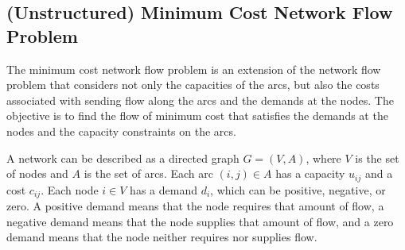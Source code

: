 \subsection{(Unstructured) Minimum Cost Network Flow Problem}
The minimum cost network flow problem is an extension of the network flow problem that considers not only the capacities of the arcs, but also the costs associated with sending flow along the arcs and the demands at the nodes. The objective is to find the flow of minimum cost that satisfies the demands at the nodes and the capacity constraints on the arcs.

A network can be described as a directed graph \( G = (V, A) \), where \( V \) is the set of nodes and \( A \) is the set of arcs. Each arc \( (i, j) \in A \) has a capacity \( u_{ij} \) and a cost \( c_{ij} \). Each node \( i \in V\) has a demand \( d_i \), which can be positive, negative, or zero. A positive demand means that the node requires that amount of flow, a negative demand means that the node supplies that amount of flow, and a zero demand means that the node neither requires nor supplies flow.

